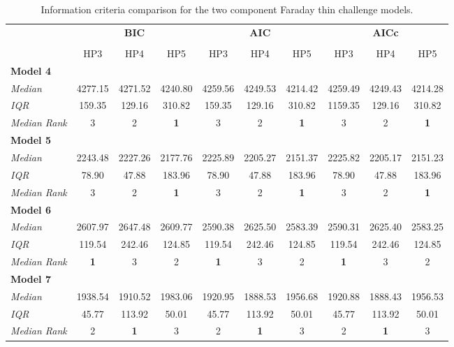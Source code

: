 \documentclass[fleqn,usenatbib]{mnras}
\begin{document}
\begin{table}
\caption{Information criteria comparison for the \protect\cite{Sun_2015} two component Faraday thin challenge models.}
    \centering
    \begin{tabular}{@{\extracolsep{3pt}}lccccccccc@{}}
    \hline
     & \multicolumn{3}{c}{\textbf{BIC}} & \multicolumn{3}{c}{\textbf{AIC}} & \multicolumn{3}{c}{\textbf{AICc}} \\
     \cline{2-4} \cline{5-7} \cline{8-10} \\
     & HP3 & HP4 & HP5 & HP3 & HP4 & HP5 & HP3 & HP4 & HP5 \\\hline
    \textbf{Model 4} & & & & & & & & & \\
    \emph{Median} & 4277.15 & 4271.52 & 4240.80 & 4259.56 & 4249.53 & 4214.42 & 4259.49 & 4249.43 & 4214.28 \\
    \emph{IQR} & 159.35 & 129.16 & 310.82 & 159.35 & 129.16 & 310.82 & 1159.35 & 129.16 & 310.82 \\
    \emph{Median Rank} & 3 & 2 & \textbf{1} & 3 & 2 & \textbf{1} & 3 & 2 & \textbf{1} \\\hline
    \textbf{Model 5} & & & & & & & & & \\
    \emph{Median} & 2243.48 & 2227.26 & 2177.76 & 2225.89 & 2205.27 & 2151.37 & 2225.82 & 2205.17 & 2151.23 \\
    \emph{IQR} & 78.90 & 47.88 & 183.96 & 78.90 & 47.88 & 183.96 & 78.90 & 47.88 & 183.96 \\
    \emph{Median Rank} & 3 & 2 & \textbf{1} & 3 & 2 & \textbf{1} & 3 & 2 & \textbf{1} \\\hline
    \textbf{Model 6} & & & & & & & & & \\
    \emph{Median} & 2607.97 & 2647.48 & 2609.77 & 2590.38 & 2625.50 & 2583.39 & 2590.31 & 2625.40 & 2583.25 \\
    \emph{IQR} & 119.54 & 242.46 & 124.85 & 119.54 & 242.46 & 124.85 & 119.54 & 242.46 & 124.85 \\
    \emph{Median Rank} & \textbf{1} & 3 & 2 & \textbf{1} & 3 & 2 & \textbf{1} & 3 & 2 \\\hline
    \textbf{Model 7} & & & & & & & & & \\
    \emph{Median} & 1938.54 & 1910.52 & 1983.06 & 1920.95 & 1888.53 & 1956.68 & 1920.88 & 1888.43 & 1956.53 \\
    \emph{IQR} & 45.77 & 113.92 & 50.01 & 45.77 & 113.92 & 50.01 & 45.77 & 113.92 & 50.01 \\
    \emph{Median Rank} & 2 & \textbf{1} & 3 & 2 & \textbf{1} & 3 & 2 & \textbf{1} & 3 \\\hline

\end{tabular}
\end{table}
\end{document}
